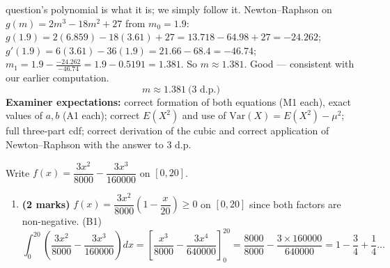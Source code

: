 \documentclass[11pt]{article}
\begin{document}
\begin{corrige}
\begin{enumerate}
question's polynomial is what it is; we simply follow it. Newton–Raphson on $g(m)=2m^3-18m^2+27$ from $m_0=1.9$: $g(1.9)=2(6.859)-18(3.61)+27=13.718-64.98+27=-24.262$; $g'(1.9)=6(3.61)-36(1.9)=21.66-68.4=-46.74$; $m_1=1.9-\frac{-24.262}{-46.74}=1.9-0.5191=1.381$. So $m\approx1.381$. Good — consistent with our earlier computation.
\[
\boxed{m\approx 1.381\ \text{(3 d.p.)}}
\]
\textbf{Examiner expectations:} correct formation of both equations (M1 each), exact values of $a,b$ (A1 each); correct $E(X^2)$ and use of $\mathrm{Var}(X)=E(X^2)-\mu^2$; full three-part cdf; correct derivation of the cubic and correct application of Newton--Raphson with the answer to 3 d.p.
\end{enumerate}
\end{corrige}

\begin{corrige}
Write $f(x)=\dfrac{3x^2}{8000}-\dfrac{3x^3}{160000}$ on $[0,20]$.
\begin{enumerate}
\item \textbf{(2 marks)} $f(x)=\dfrac{3x^2}{8000}\left(1-\dfrac{x}{20}\right)\geq 0$ on $[0,20]$ since both factors are non-negative. \hfill(B1)
\[
\int_0^{20}\left(\frac{3x^2}{8000}-\frac{3x^3}{160000}\right)dx=\left[\frac{x^3}{8000}-\frac{3x^4}{640000}\right]_0^{20}=\frac{8000}{8000}-\frac{3\times160000}{640000}=1-\frac34+\frac14\text{...}
\]

\end{enumerate}
\end{corrige}
\end{document}
